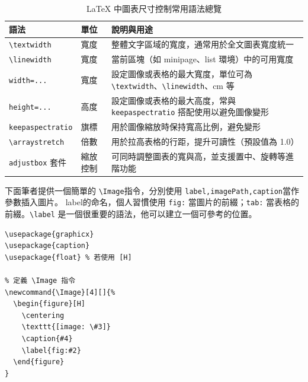 \begin{table}[H]
  \centering
  \begin{tabular}{@{}llp{7cm}@{}}
    \toprule
    \textbf{語法} & \textbf{單位} & \textbf{說明與用途} \\
    \midrule
    \verb|\textwidth| & 寬度 & 整體文字區域的寬度，通常用於全文圖表寬度統一 \\
    \verb|\linewidth| & 寬度 & 當前區塊（如 minipage、list 環境）中的可用寬度 \\
    \verb|width=...|   & 寬度 & 設定圖像或表格的最大寬度，單位可為 \verb|\textwidth|、\verb|\linewidth|、cm 等 \\
    \verb|height=...|  & 高度 & 設定圖像或表格的最大高度，常與 \verb|keepaspectratio| 搭配使用以避免圖像變形 \\
    \verb|keepaspectratio| & 旗標 & 用於圖像縮放時保持寬高比例，避免變形 \\
    \verb|\arraystretch| & 倍數 & 用於拉高表格的行距，提升可讀性（預設值為 1.0） \\
    \verb|adjustbox| 套件 & 縮放控制 & 可同時調整圖表的寬與高，並支援置中、旋轉等進階功能 \\
    \bottomrule
  \end{tabular}
  \caption{LaTeX 中圖表尺寸控制常用語法總覽}
  \label{tab:dimension-control}
\end{table}

下面筆者提供一個簡單的 \texttt{\textbackslash Image}指令，分別使用 \texttt{label,imagePath,caption}當作參數插入圖片。
label的命名，個人習慣使用 \texttt{fig:} 當圖片的前綴；\texttt{tab:} 當表格的前綴。\texttt{\textbackslash label} 是一個很重要的語法，他可以建立一個可參考的位置。

\begin{verbatim}
\usepackage{graphicx}
\usepackage{caption}
\usepackage{float} % 若使用 [H]

% 定義 \Image 指令
\newcommand{\Image}[4][]{%
  \begin{figure}[H]
    \centering
    \texttt{[image: \#3]}
    \caption{#4}
    \label{fig:#2}
  \end{figure}
}
\end{verbatim}